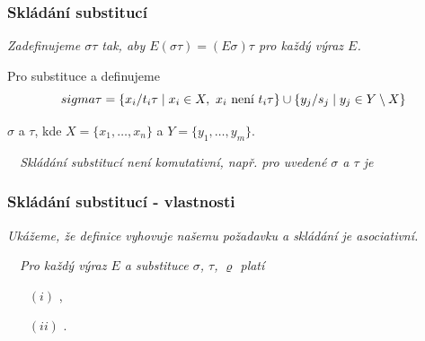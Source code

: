     
    
    \subsubsection*{Skládání substitucí}
    {\it Zadefinujeme $\sigma\tau$ tak, aby $E(\sigma\tau)=(E\sigma)\tau$ pro každý výraz $E$.}
    \medskip
    
    \vspace{-2mm}
    
    \vspace{-6mm}
    \bigskip
    
    Pro substituce  a  definujeme
    \vspace{-1mm}
  $$\\sigma\tau=\{x_i/t_i\tau\mid x_i\in X,\text{ $x_i$ není $t_i\tau$}\}\cup\{y_j/s_j\mid y_j\in Y\setminus X\}$$
    
    \vspace{-5mm}
     $\sigma$ a $\tau$, kde $X=\{x_1,\dots,x_n\}$ a $Y=\{y_1,\dots,y_m\}$.
    \bigskip
    
    {\it {}\ \ Skládání substitucí není komutativní, např. pro uvedené $\sigma$ a $\tau$ je}
    \vspace{-2mm}
    
    \vspace{-6mm}
    
    
    
    \subsubsection*{Skládání substitucí - vlastnosti}
    {\it Ukážeme, že definice vyhovuje našemu požadavku a skládání je asociativní.}
    \medskip
    
    {\bf {}}\ \ {\it Pro každý výraz $E$ a substituce $\sigma$, $\tau$, $\varrho$ platí}
    \begin{enumerate}
    \item[$(i)$] ,
    \item[$(ii)$] \mygreen{$(\sigma\tau)\varrho=\sigma(\tau\varrho)$}.
    \end{enumerate}
    \medskip
    
